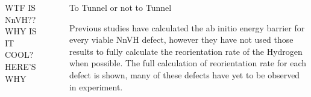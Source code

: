 \documentclass[final]{beamer}
\newlength{\sepwidth}
\newlength{\colwidth}
\newcommand{\separatorcolumn}{\begin{column}{\sepwidth}\end{column}}
\begin{document}
\begin{frame}[t]
\begin{columns}[t]
\begin{column}{\colwidth}
    

  \begin{block}{WTF IS NnVH?? WHY IS IT COOL? HERE'S WHY}



  \end{block}

\end{column}

\separatorcolumn

\begin{column}{\colwidth}


  \begin{block}{To Tunnel or not to Tunnel}

    Previous studies have calculated the ab initio energy barrier for every viable NnVH defect, however they have not used those results to fully calculate the reorientation rate of the Hydrogen when possible. The full calculation of reorientation rate for each defect is shown, many of these defects have yet to be observed in experiment.


\end{block}
\end{column}
\end{columns}
\end{frame}
\end{document}
